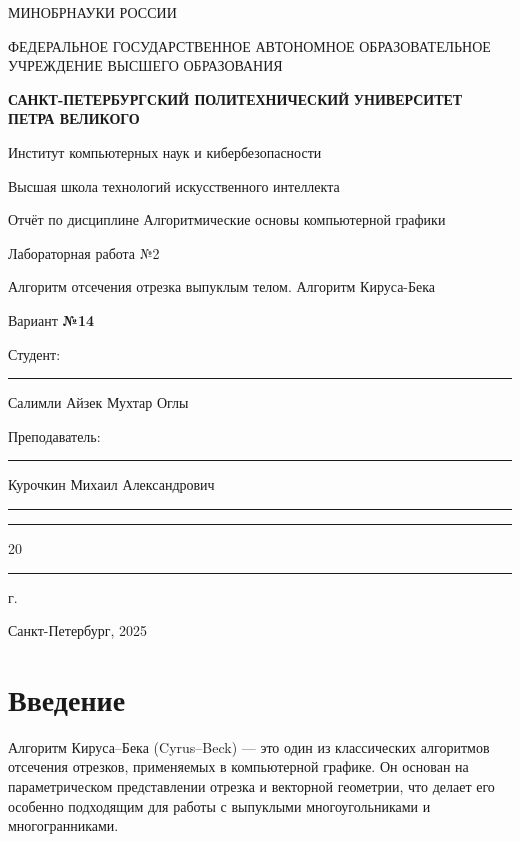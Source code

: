\documentclass[areasetadvanced]{scrartcl}
\begin{document}
\sloppy
	\thispagestyle{empty}
	\begin{center}
		\large{МИНОБРНАУКИ РОССИИ} \par
		\vspace{0.3cm}
		\normalsize
		{ФЕДЕРАЛЬНОЕ ГОСУДАРСТВЕННОЕ АВТОНОМНОЕ ОБРАЗОВАТЕЛЬНОЕ УЧРЕЖДЕНИЕ ВЫСШЕГО ОБРАЗОВАНИЯ} \par
		\vspace{0.3cm}
		\textbf{\guillemotleft САНКТ-ПЕТЕРБУРГСКИЙ ПОЛИТЕХНИЧЕСКИЙ}
		\textbf{УНИВЕРСИТЕТ ПЕТРА ВЕЛИКОГО\guillemotright} \par
		\vspace{0.3cm}
		{Институт компьютерных наук и кибербезопасности}\par
		{Высшая школа технологий искусственного интеллекта}\par
	\end{center}
	\vfill
	\begin{center}
		{\large Отчёт по дисциплине \guillemotleft Алгоритмические основы компьютерной графики\guillemotright}\par
		{\huge Лабораторная работа №2 
		
		\guillemotleft Алгоритм отсечения отрезка выпуклым телом. Алгоритм Кируса-Бека\guillemotright}\par
            {\huge Вариант \textbf{№14}}
         
	\end{center}
	\vfill
	\begin{flushleft}
		Студент: \hspace{1.8cm} \rule[0pt]{2.5cm}{0.5pt}\hfill Салимли Айзек Мухтар Оглы\par
		\vspace{1.5cm}
		Преподаватель: \hspace{0.55cm} \rule[0pt]{2.5cm}{0.5pt}\hfill Курочкин Михаил Александрович
	\end{flushleft}
	\vspace{0.5cm}
	\begin{flushright}
		\guillemotleft \rule[0pt]{0.8cm}{0.5pt}\guillemotright \rule[0pt]{2cm}{0.5pt} 20\rule[0pt]{0.5cm}{0.5pt} г.
	\end{flushright}
	\vfill
	\begin{center}
		Санкт-Петербург, 2025
	\end{center}
	\newpage
	\tableofcontents
	\newpage
\section*{Введение}
    Алгоритм Кируса–Бека (Cyrus–Beck) — это один из классических алгоритмов отсечения отрезков, применяемых в компьютерной графике. Он основан на параметрическом представлении отрезка и векторной геометрии, что делает его особенно подходящим для работы с выпуклыми многоугольниками и многогранниками.
\end{document}

